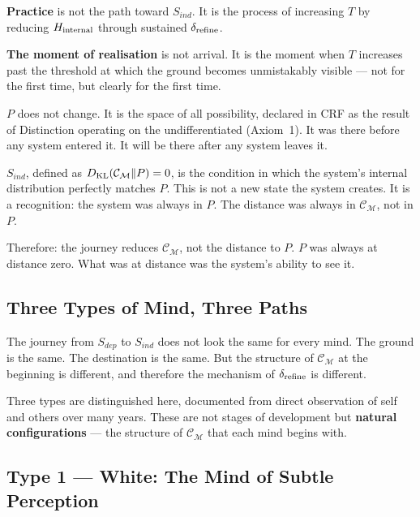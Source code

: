 \documentclass[12pt, a4paper]{article}
\begin{document}
\textbf{Practice} is not the path toward $S_{ind}$.
It is the process of increasing $T$ by reducing $H_{\rm internal}$
through sustained $\delta_{\rm refine}$.

\textbf{The moment of realisation} is not arrival. It is the moment when $T$
increases past the threshold at which the ground becomes unmistakably visible ---
not for the first time, but clearly for the first time.

\begin{derivedbox}[title={Why the Ground Was Always There}]
$P$ does not change. It is the space of all possibility, declared in CRF as the
result of Distinction operating on the undifferentiated (Axiom~1). It was there
before any system entered it. It will be there after any system leaves it.

$S_{ind}$, defined as $D_{\rm KL}(\mathcal{C}_\mathcal{M}\|P) = 0$, is the condition
in which the system's internal distribution perfectly matches $P$. This is not a
new state the system creates. It is a recognition: the system was always in $P$.
The distance was always in $\mathcal{C}_\mathcal{M}$, not in $P$.

Therefore: the journey reduces $\mathcal{C}_\mathcal{M}$, not the distance to $P$.
$P$ was always at distance zero. What was at distance was the system's
ability to see it.
\end{derivedbox}

\subsection*{Three Types of Mind, Three Paths}

The journey from $S_{dep}$ to $S_{ind}$ does not look the same for every mind.
The ground is the same. The destination is the same. But the structure of
$\mathcal{C}_\mathcal{M}$ at the beginning is different, and therefore the
mechanism of $\delta_{\rm refine}$ is different.

Three types are distinguished here, documented from direct observation
of self and others over many years. These are not stages of development
but \textbf{natural configurations} --- the structure of $\mathcal{C}_\mathcal{M}$
that each mind begins with.

\subsection{Type 1 --- White: The Mind of Subtle Perception}
\end{document}
